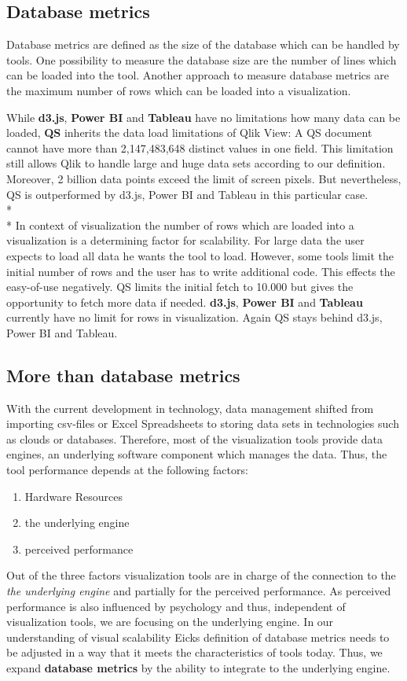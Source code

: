 \subsection{Database metrics}
Database metrics are defined as the size of the database which can be handled by tools\cite{Eick2002}. One possibility to measure the database size are the number of lines which can be loaded into the tool. Another approach to measure database metrics are the maximum number of rows which can be loaded into a visualization.
\par
While \textbf{d3.js}, \textbf{Power BI} and \textbf{Tableau} have no limitations how many data can be loaded, \textbf{QS} inherits the data load limitations of Qlik View: A QS document cannot have more than 2,147,483,648 distinct values in one field. This limitation still allows Qlik to handle large and huge data sets according to our definition. Moreover, 2 billion data points exceed the limit of screen pixels. But nevertheless, QS is outperformed by d3.js, Power BI and Tableau in this particular case.
\\*\\*
In context of visualization the number of rows which are loaded into a visualization is a determining factor for scalability. For large data the user expects to load all data he wants the tool to load. However, some tools limit the initial number of rows and the user has to write additional code. This effects the easy-of-use negatively.
QS limits the initial fetch to 10.000 but gives the opportunity to fetch more data if needed. \textbf{d3.js}, \textbf{Power BI} and \textbf{Tableau} currently have no limit for rows in visualization.
Again QS stays behind d3.js, Power BI and Tableau.

\subsection*{More than database metrics}
With the current development in technology, data management shifted from importing csv-files or Excel Spreadsheets to storing data sets in technologies such as clouds or databases.
Therefore, most of the visualization tools provide data engines, an underlying software component which manages the data. Thus, the tool performance depends at the following factors:
\begin{enumerate}
    \item Hardware Resources
    \item the underlying engine
    \item perceived performance 
\end{enumerate}
Out of the three factors visualization tools are in charge of the connection to the \textit{the underlying engine} and partially for the perceived performance. As perceived performance is also influenced by psychology and thus, independent of visualization tools, we are focusing on the underlying engine.
In our understanding of visual scalability Eicks definition of database metrics needs to be adjusted in a way that it meets the characteristics of tools today. Thus, we expand \textbf{database metrics} by the ability to integrate to the underlying engine.

